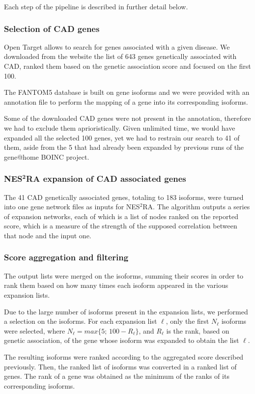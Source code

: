 \documentclass[fleqn,10pt]{SelfArx} %
\begin{document}
Each step of the pipeline is described in further detail below.

\subsubsection*{Selection of CAD genes}
Open Target allows to search for genes associated with a given disease. We downloaded from the website the list of 643 genes genetically associated with CAD, ranked them based on the genetic association score and focused on the first 100.

The FANTOM5 database is built on gene isoforms and we were provided with an annotation file to perform the mapping of a gene into its corresponding isoforms.

Some of the downloaded CAD genes were not present in the annotation, therefore we had to exclude them aprioristically. Given unlimited time, we would have expanded all the selected 100 genes, yet we had to restrain our search to 41 of them, aside from the 5 that had already been expanded by previous runs of the gene@home BOINC project.

\subsubsection*{NES$^{\textbf{2}}$RA expansion of CAD associated genes}
The 41 CAD genetically associated genes, totaling to 183 isoforms, were turned into one gene network files as inputs for NES$^2$RA.
The algorithm outputs a series of expansion networks, each of which is a list of nodes ranked on the reported score, which is a measure of the strength of the supposed correlation between that node and the input one. 

\subsubsection*{Score aggregation and filtering}
The output lists were merged on the isoforms, summing their scores in order to rank them based on how many times each isoform appeared in the various expansion lists.

Due to the large number of isoforms present in the expansion lists, we performed a selection on the isoforms. For each expansion list $\ell$, only the first $N_\ell$ isoforms were selected, where $N_\ell=max\{5;\,100-R_\ell\}$, and $R_\ell$ is the rank, based on genetic association, of the gene whose isoform was expanded to obtain the list $\ell$. 

The resulting isoforms were ranked according to the aggregated score described previously. Then, the ranked list of isoforms was converted in a ranked list of genes. The rank of a gene was obtained as the minimum of the ranks of its corresponding isoforms. 
\end{document}
